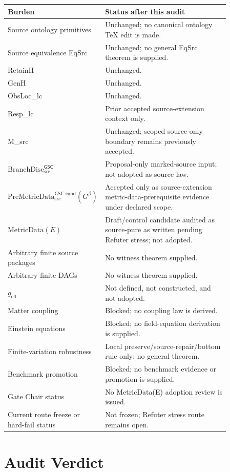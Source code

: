 \documentclass[11pt]{article}
\newcommand{\PreMetricData}{\mathrm{PreMetricData}_{\mathrm{src}}^{\mathsf{GSC}\mbox{-}\mathrm{cand}}}
\newcommand{\BranchDisc}{\mathrm{BranchDisc}_{\mathrm{src}}^{\mathsf{GSC}}}
\newcommand{\Gbeta}{G^\beta}
\newcommand{\geff}{g_{\mathrm{eff}}}
\begin{document}
\begin{longtable}{p{0.30\linewidth}p{0.56\linewidth}}
\toprule
Burden & Status after this audit \\
\midrule
Source ontology primitives & Unchanged; no canonical ontology TeX edit is made. \\
Source equivalence EqSrc & Unchanged; no general EqSrc theorem is supplied. \\
RetainH & Unchanged. \\
GenH & Unchanged. \\
ObsLoc\_lc & Unchanged. \\
Resp\_lc & Prior accepted source-extension context only. \\
M\_src & Unchanged; scoped source-only boundary remains previously accepted. \\
\(\BranchDisc\) & Proposal-only marked-source input; not adopted as source law. \\
\(\PreMetricData(\Gbeta)\) & Accepted only as source-extension metric-data-prerequisite evidence under declared scope. \\
\(\mathrm{MetricData}(E)\) & Draft/control candidate audited as source-pure as written pending Refuter stress; not adopted. \\
Arbitrary finite source packages & No witness theorem supplied. \\
Arbitrary finite DAGs & No witness theorem supplied. \\
\(\geff\) & Not defined, not constructed, and not adopted. \\
Matter coupling & Blocked; no coupling law is derived. \\
Einstein equations & Blocked; no field-equation derivation is supplied. \\
Finite-variation robustness & Local preserve/source-repair/bottom rule only; no general theorem. \\
Benchmark promotion & Blocked; no benchmark evidence or promotion is supplied. \\
Gate Chair status & No MetricData(E) adoption review is issued. \\
Current route freeze or hard-fail status & Not frozen; Refuter stress route remains open. \\
\bottomrule
\end{longtable}

\section{Audit Verdict}
\end{document}
